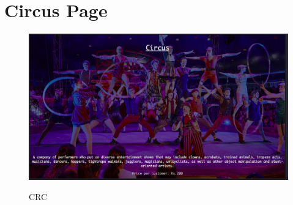 \section{Circus Page}
\begin{figure}[H]
\centering
\caption{CRC}
\includegraphics[scale=.5]{./crc.png}
\\[0.2in]
\label{fig:ER diagram}
\end{figure}

\thispagestyle{fancy}








